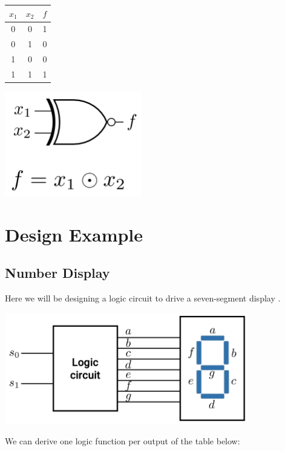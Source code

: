 \documentclass[12pt,openany]{book}
\begin{document}
					\begin{minipage}[htp]{0.45\textwidth} %
						\centering
						\begin{tabular}{|c|c|c|}
							\hline
							\( x_1 \) & \( x_2 \) & \( f \) \\
							\hline
							0         & 0         & 1       \\
							0         & 1         & 0       \\
							1         & 0         & 0       \\
							1         & 1         & 1       \\
							\hline
						\end{tabular}
					\end{minipage}
					\hfill
					\vline
					\hfill
					\begin{minipage}[htp]{0.45\textwidth}
						\centering
						\includegraphics[width=0.45\textwidth]{circuits/6.11.2.png} %
					\end{minipage}

			
			      	
			      	\section{Design Example}
			      	\subsection{Number Display}
			      	Here we will be designing a logic circuit to drive a seven-segment display .
			      	\begin{center}
			      		\begin{minipage}[htp]{0.80\textwidth} %
			      			\centering
			      			\includegraphics[width=0.80\textwidth]{circuits/6.12.1.png} 
			      		\end{minipage}
			      	\end{center}
			      	We can derive one logic function per output of the table below:
			      	\newline
\end{document}
